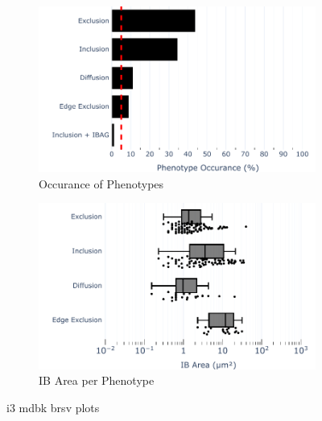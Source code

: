 \begin{figure}
    \begin{subfigure}{0.5\textwidth}
        \includegraphics[width=1\linewidth]{09. Chapter 4/Figs/02. Infection/02. IFIT3/07. bar_i3_mdbk.pdf} 
        \caption[]{Occurance of Phenotypes}
    \end{subfigure}
    \begin{subfigure}{0.5\textwidth}
        \includegraphics[width=1\linewidth]{09. Chapter 4/Figs/02. Infection/02. IFIT3/08. box_i3_mdbk.pdf}
        \caption[]{IB Area per Phenotype}
    \end{subfigure}
    \caption[i3 mdbk brsv plots]{i3 mdbk brsv plots}
    \label{fig:i3 mdbk brsv plots}
\end{figure}

